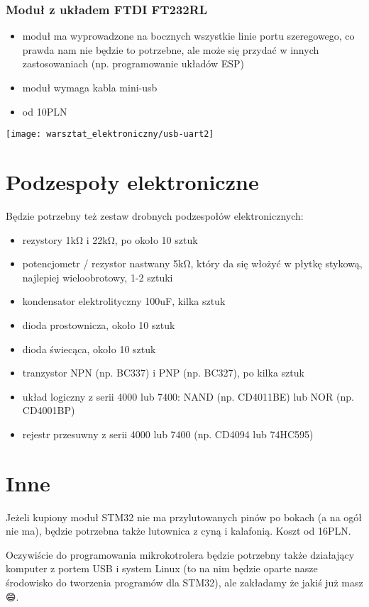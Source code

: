 \documentclass{pdfBooklets}
\newcommand\zaleta{\item[\textbf{\ttfamily +}]}
\newcommand\wada{\item[\textbf{\ttfamily -}]}
\newcommand\info{\item[\textbf{\ttfamily *}]}
\begin{document}
	\subsubsection{Moduł z układem FTDI FT232RL}
	\parbox[c]{0.65\textwidth}{
		\begin{itemize}
			\zaleta moduł ma wyprowadzone na bocznych wszystkie linie portu szeregowego, co prawda nam nie będzie to potrzebne, ale może się przydać w innych zastosowaniach (np. programowanie układów ESP)
			\wada moduł wymaga kabla mini-usb
			\info od 10PLN
		\end{itemize}
	}
	\parbox[c]{0.33\textwidth}{
		\begin{flushright} \texttt{[image: warsztat\_elektroniczny/usb-uart2]} \end{flushright}
	}
	
\section{Podzespoły elektroniczne}

Będzie potrzebny też zestaw drobnych podzespołów elektronicznych:
\begin{itemize}
	\item rezystory 1kΩ i 22kΩ, po około 10 sztuk
	\item potencjometr / rezystor nastwany 5kΩ, który da się włożyć w płytkę stykową, najlepiej wieloobrotowy, 1-2 sztuki
	\item kondensator elektrolityczny 100uF, kilka sztuk
	
	\item dioda prostownicza, około 10 sztuk
	\item dioda świecąca, około 10 sztuk
	\item tranzystor NPN (np. BC337) i PNP (np. BC327), po kilka sztuk
	
	\item układ logiczny z serii 4000 lub 7400: NAND (np. CD4011BE) lub NOR (np. CD4001BP)
	\item rejestr przesuwny z serii 4000 lub 7400 (np. CD4094 lub 74HC595)
\end{itemize}

\section{Inne}
Jeżeli kupiony moduł STM32 nie ma przylutowanych pinów po bokach (a na ogół nie ma), będzie potrzebna także lutownica z cyną i kalafonią. Koszt od 16PLN.

Oczywiście do programowania mikrokotrolera będzie potrzebny także działający komputer z portem USB i system Linux (to na nim będzie oparte nasze środowisko do tworzenia programów dla STM32), ale zakładamy że jakiś już masz {\Symbola 😄}.

\end{document}
